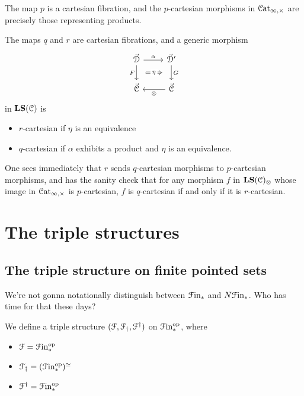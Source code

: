 \documentclass[main.tex]{subfiles}
\begin{document}
\begin{proposition}
  The map $p$ is a cartesian fibration, and the $p$-cartesian morphisms in $\mathcal{C}\mathrm{at}_{\infty,\times}$ are precisely those representing products.
\end{proposition}

\begin{proposition}
  The maps $q$ and $r$ are cartesian fibrations, and a generic morphism
  \begin{equation*}
    \begin{tikzcd}
      \vec{\category{D}}
      \arrow[r, "\alpha"]
      \arrow[d, ""{name=L, right}, "F"{left}]
      & \vec{\category{D}}'
      \arrow[d, ""{name=R, left}, "G"{right}]
      \\
      \vec{\category{C}}
      & \vec{\category{C}}
      \arrow[l, "\otimes"]
      \arrow[Rightarrow, from=L, to=R, shorten=1.5ex, "\eta"{description}]
    \end{tikzcd}
  \end{equation*}
  in $\mathbf{LS}(\mathcal{C})$ is
  \begin{itemize}
    \item $r$-cartesian if $\eta$ is an equivalence

    \item $q$-cartesian if $\alpha$ exhibits a product and $\eta$ is an equivalence.
  \end{itemize}
\end{proposition}
One sees immediately that $r$ sends $q$-cartesian morphisms to $p$-cartesian morphisms, and has the sanity check that for any morphism $f$ in $\mathbf{LS}(\mathcal{C})_{\otimes}$ whose image in $\mathcal{C}\mathrm{at}_{\infty,\times}$ is $p$-cartesian, $f$ is $q$-cartesian if and only if it is $r$-cartesian.

\section{The triple structures}
\label{sec:the_triple_structures}

\subsection{The triple structure on finite pointed sets}
\label{ssc:the_triple_structure_on_finite_pointed_sets}

We're not gonna notationally distinguish between $\mathcal{F}\mathrm{in}_{*}$ and $N\mathcal{F}\mathrm{in}_{*}$. Who has time for that these days?

We define a triple structure $(\mathcal{F}, \mathcal{F}_{\dagger}, \mathcal{F}^{\dagger})$ on $\mathcal{F}\mathrm{in}_{*}^{\mathrm{op}}$, where
\begin{itemize}
  \item $\mathcal{F} = \mathcal{F}\mathrm{in}_{*}^{\mathrm{op}}$

  \item $\mathcal{F}_{\dagger} = (\mathcal{F}\mathrm{in}_{*}^{\mathrm{op}})^{\simeq}$

  \item $\mathcal{F}^{\dagger} = \mathcal{F}\mathrm{in}_{*}^{\mathrm{op}}$
\end{itemize}
\end{document}
